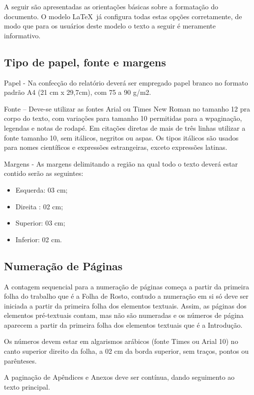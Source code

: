 A seguir são apresentadas as orientações básicas sobre a formatação do
documento. O modelo \LaTeX\ já configura todas estas opções corretamente,
de modo que para os usuários deste modelo o texto a seguir é meramente
informativo.

\subsection{Tipo de papel, fonte e margens}

Papel - Na confecção do relatório deverá ser empregado papel branco no 
formato padrão A4 (21 cm x 29,7cm), com 75 a 90 g/m2.

Fonte – Deve-se utilizar as fontes Arial ou Times New Roman no tamanho 12 
pra corpo do texto, com variações para tamanho 10 permitidas para a 
wpaginação, legendas e notas de rodapé. Em citações diretas de mais de três 
linhas utilizar a fonte tamanho 10, sem itálicos, negritos ou aspas. Os 
tipos itálicos são usados para nomes científicos e expressões estrangeiras, 
exceto expressões latinas.

Margens - As margens delimitando a região na qual todo o texto deverá estar 
contido serão as seguintes: 

\begin{itemize}
	\item Esquerda: 03 cm;
	\item Direita	: 02 cm;
	\item Superior: 03 cm;
	\item Inferior: 02 cm. 
\end{itemize}

\subsection{Numeração de Páginas}

A contagem sequencial para a numeração de páginas começa a partir da 
primeira folha do trabalho que é a Folha de Rosto, contudo a numeração em 
si só deve ser iniciada a partir da primeira folha dos elementos textuais. 
Assim, as páginas dos elementos pré-textuais contam, mas não são numeradas 
e os números de página aparecem a partir da primeira folha dos elementos 
textuais que é a Introdução. 

Os números devem estar em algarismos arábicos (fonte Times ou Arial 10) no 
canto superior direito da folha, a 02 cm da borda superior, sem traços, 
pontos ou parênteses. 

A paginação de Apêndices e Anexos deve ser contínua, dando seguimento ao 
texto principal.

